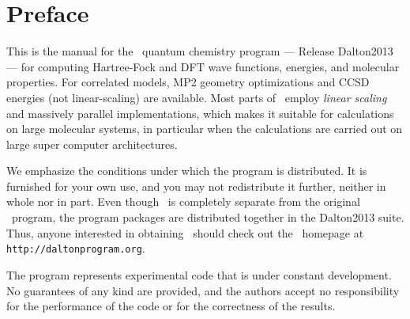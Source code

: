 
\chapter*{Preface}

This is the manual for the \lsdalton\ quantum chemistry program
--- Release Dalton2013 --- for computing Hartree-Fock and DFT
wave functions, energies, and molecular properties.
For correlated models, 
MP2 geometry optimizations and CCSD energies (not linear-scaling) are available.
Most parts of \lsdalton\ employ {\em linear scaling} and massively parallel implementations, which makes it suitable for calculations on large molecular systems, in particular when the calculations are carried out on large super computer architectures.

We emphasize the conditions under which the
program is distributed.  It is furnished for your own use,
and you may not redistribute it further, neither in whole nor in
part.  Even though \lsdalton\ is completely separate from the original
\dalton\ program, the program packages are distributed together in the
Dalton2013 suite. Thus, 
anyone interested in obtaining \lsdalton\ should check out the
\dalton\ homepage at
\verb|http://daltonprogram.org|.


The program represents experimental code that is
under constant development.  No guarantees of any kind are
provided, and the authors accept no responsibility for the
performance of the code or for the correctness of the results.

